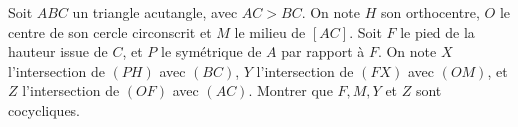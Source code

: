 Soit $ABC$ un triangle acutangle, avec $AC > BC$. On note $H$ son orthocentre, $O$ le centre de son cercle circonscrit et $M$ le milieu de $[AC]$. Soit $F$ le pied de la hauteur issue de $C$, et $P$ le symétrique de $A$ par rapport à $F$. On note $X$ l'intersection de $(PH)$ avec $(BC)$, $Y$ l'intersection de $(FX)$ avec $(OM)$, et $Z$ l'intersection de $(OF)$ avec $(AC)$. Montrer que $F, M, Y$ et $Z$ sont cocycliques.